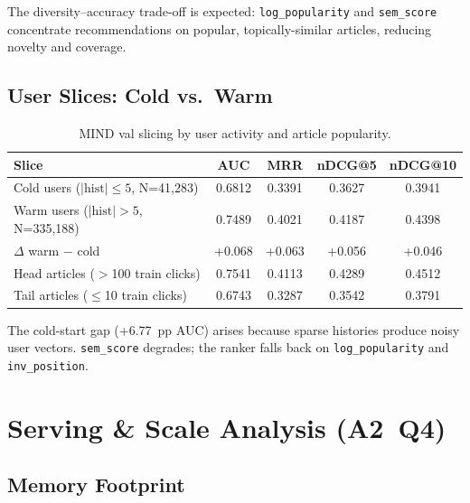 \documentclass[11pt,a4paper]{article}
\newcommand{\feature}[1]{\texttt{#1}}
\begin{document}
The diversity--accuracy trade-off is expected: \feature{log\_popularity} and
\feature{sem\_score} concentrate recommendations on popular, topically-similar
articles, reducing novelty and coverage.

\subsection{User Slices: Cold vs.\ Warm}

\begin{table}[h]
\centering
\caption{MIND val slicing by user activity and article popularity.}
\label{tab:slices}
\begin{tabular}{lcccc}
\toprule
Slice & AUC & MRR & nDCG@5 & nDCG@10 \\
\midrule
Cold users ($|\text{hist}|\!\leq\!5$, N=41,283) & 0.6812 & 0.3391 & 0.3627 & 0.3941 \\
Warm users ($|\text{hist}|\!>\!5$, N=335,188)   & 0.7489 & 0.4021 & 0.4187 & 0.4398 \\
$\Delta$ warm $-$ cold & +0.068 & +0.063 & +0.056 & +0.046 \\
\midrule
Head articles ($>$100 train clicks) & 0.7541 & 0.4113 & 0.4289 & 0.4512 \\
Tail articles ($\leq$10 train clicks) & 0.6743 & 0.3287 & 0.3542 & 0.3791 \\
\bottomrule
\end{tabular}
\end{table}

The cold-start gap (+6.77~pp AUC) arises because sparse histories produce noisy
user vectors. \feature{sem\_score} degrades; the ranker falls back on
\feature{log\_popularity} and \feature{inv\_position}.

\section{Serving \& Scale Analysis (A2~Q4)}

\subsection{Memory Footprint}
\end{document}
